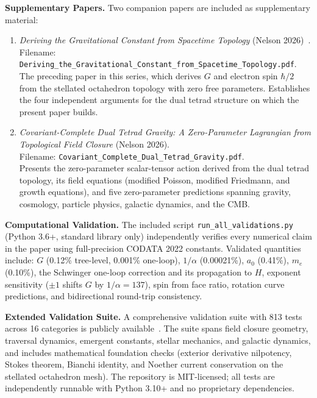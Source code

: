 \documentclass[aps,prd,preprint,superscriptaddress,showpacs,preprintnumbers,amsmath,amssymb,nofootinbib]{revtex4-2}
\begin{document}
\textbf{Supplementary Papers.}\quad
Two companion papers are included as supplementary material:
\begin{enumerate}[leftmargin=2em]
\item \textit{Deriving the Gravitational Constant from Spacetime Topology} (Nelson 2026)~\cite{paper6}.\\Filename: \texttt{Deriving\_the\_Gravitational\_Constant\_from\_Spacetime\_Topology.pdf}.\\The preceding paper in this series, which derives $G$ and electron spin $\hbar/2$ from the stellated octahedron topology with zero free parameters. Establishes the four independent arguments for the dual tetrad structure on which the present paper builds.

\item \textit{Covariant-Complete Dual Tetrad Gravity: A Zero-Parameter Lagrangian from Topological Field Closure} (Nelson 2026).\\Filename: \texttt{Covariant\_Complete\_Dual\_Tetrad\_Gravity.pdf}.\\Presents the zero-parameter scalar-tensor action derived from the dual tetrad topology, its field equations (modified Poisson, modified Friedmann, and growth equations), and five zero-parameter predictions spanning gravity, cosmology, particle physics, galactic dynamics, and the CMB.
\end{enumerate}

\textbf{Computational Validation.}\quad
The included script \texttt{run\_all\_validations.py} (Python 3.6+, standard library only) independently verifies every numerical claim in the paper using full-precision CODATA 2022 constants. Validated quantities include: $G$ (0.12\% tree-level, 0.001\% one-loop), $1/\alpha$ (0.00021\%), $a_0$ (0.41\%), $m_e$ (0.10\%), the Schwinger one-loop correction and its propagation to $H$, exponent sensitivity ($\pm 1$ shifts $G$ by $1/\alpha = 137$), spin from face ratio, rotation curve predictions, and bidirectional round-trip consistency.

\textbf{Extended Validation Suite.}\quad
A comprehensive validation suite with 813 tests across 16 categories is publicly available~\cite{gfm-repo}. The suite spans field closure geometry, traversal dynamics, emergent constants, stellar mechanics, and galactic dynamics, and includes mathematical foundation checks (exterior derivative nilpotency, Stokes theorem, Bianchi identity, and Noether current conservation on the stellated octahedron mesh). The repository is MIT-licensed; all tests are independently runnable with Python 3.10+ and no proprietary dependencies.
\end{document}

